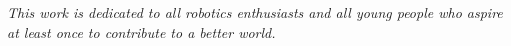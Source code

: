 \documentclass[../../monografia.tex]{subfiles}
\begin{document}
\vspace*{\fill}

\centering
\noindent
\textit{This work is dedicated to all robotics enthusiasts and all young people who aspire at least once to contribute to a better world.}

\vspace*{\fill}



\end{document}
